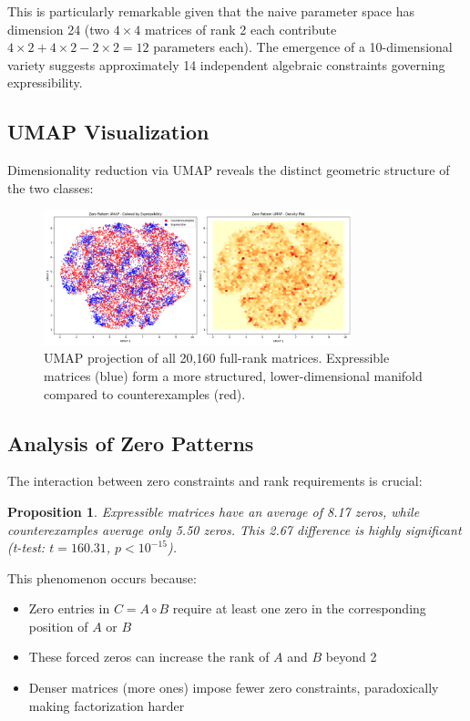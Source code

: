 \documentclass[11pt]{amsart}
\theoremstyle{plain}
\newtheorem{proposition}[theorem]{Proposition}
\theoremstyle{definition}
\theoremstyle{remark}
\begin{document}
This is particularly remarkable given that the naive parameter space has dimension 24 (two $4 \times 4$ matrices of rank 2 each contribute $4 \times 2 + 4 \times 2 - 2 \times 2 = 12$ parameters each). The emergence of a 10-dimensional variety suggests approximately 14 independent algebraic constraints governing expressibility.

\subsection{UMAP Visualization}

Dimensionality reduction via UMAP reveals the distinct geometric structure of the two classes:

\begin{figure}[H]
\centering
\includegraphics[width=0.8\textwidth]{../umap.png}
\caption{UMAP projection of all 20,160 full-rank matrices. Expressible matrices (blue) form a more structured, lower-dimensional manifold compared to counterexamples (red).}
\end{figure}

\subsection{Analysis of Zero Patterns}

The interaction between zero constraints and rank requirements is crucial:

\begin{proposition}
Expressible matrices have an average of 8.17 zeros, while counterexamples average only 5.50 zeros. This 2.67 difference is highly significant (t-test: $t = 160.31$, $p < 10^{-15}$).
\end{proposition}

This phenomenon occurs because:
\begin{itemize}
\item Zero entries in $C = A \circ B$ require at least one zero in the corresponding position of $A$ or $B$
\item These forced zeros can increase the rank of $A$ and $B$ beyond 2
\item Denser matrices (more ones) impose fewer zero constraints, paradoxically making factorization harder
\end{itemize}
\end{document}
